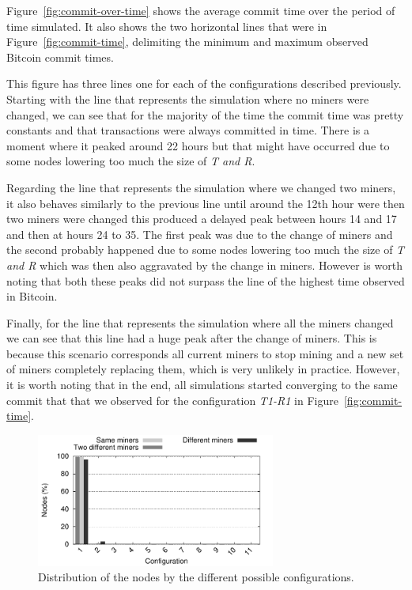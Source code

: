 Figure~\ref{fig:commit-over-time} shows the average commit time over the period of time simulated. It also shows the two horizontal lines that were in Figure~\ref{fig:commit-time}, delimiting the minimum and maximum observed Bitcoin commit times. 

This figure has three lines one for each of the configurations described previously. 
Starting with the line that represents the simulation where no miners were changed, we can see that for the majority of the time the commit time was pretty constants and that transactions were always committed in time. 
There is a moment where it peaked around 22 hours but that might have occurred due to some nodes lowering too much the size of \textsl{T and R}.

Regarding the line that represents the simulation where we changed two miners, it also behaves similarly to the previous line until around the 12th hour were then two miners were changed this produced a delayed peak between hours 14 and 17 and then at hours 24 to 35. The first peak was due to the change of miners and the second probably happened due to some nodes lowering too much the size of \textsl{T and R} which was then also aggravated by the change in miners. However is worth noting that both these peaks did not surpass the line of the highest time observed in Bitcoin.

Finally, for the line that represents the simulation where all the miners changed we can see that this line had a huge peak after the change of miners. This is because this scenario corresponds all current miners to stop mining and a new set of miners completely replacing them, which is very unlikely in practice. However, it is worth noting that in the end, all simulations started converging to the same commit that that we observed for the configuration \textsl{T1-R1} in Figure~\ref{fig:commit-time}.

\begin{figure}[h]
\centering
\includegraphics[width=0.7\textwidth]{plots/nodes_per_config.pdf}
\caption{Distribution of the nodes by the different possible configurations.}
\label{fig:node-per-conf}
\end{figure}


